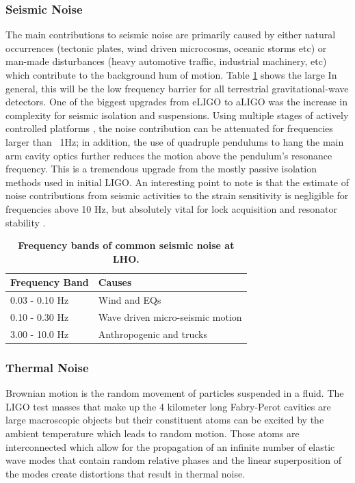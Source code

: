 		\subsubsection{Seismic Noise}
		The main contributions to seismic noise are primarily caused by either natural occurrences (tectonic plates, wind driven microcosms, oceanic storms etc) or man-made disturbances (heavy automotive traffic, industrial machinery, etc) which contribute to the background hum of motion.  Table \ref{tbl:sei_noise} shows the large   In general, this will be the low frequency barrier for all terrestrial gravitational-wave detectors.  One of the biggest upgrades from eLIGO to aLIGO was the increase in complexity for seismic isolation and suspensions.  Using multiple stages of actively controlled platforms \cite{fabrice_sei1} \cite{fabrice_sei2} \cite{fabrice_strat}\cite{sei_isol}, the noise contribution can be attenuated for frequencies larger than ~1Hz;  in addition, the use of quadruple pendulums to hang the main arm cavity optics further reduces the motion above the pendulum's resonance frequency\cite{driggers_global}\cite{BlairBook}. This is a tremendous upgrade from the mostly passive isolation methods used in initial LIGO.  An interesting point to note is that the estimate of noise contributions from seismic activities to the strain sensitivity is negligible for frequencies above 10 Hz, but absolutely vital for lock acquisition and resonator stability \cite{Hang_LF} \cite{Fritschel_alignment}.
		 
		 \begin{table}[h!]
			\centering
			\begin{tabular}{ | l | l |}
				\hline
				\textbf{Frequency Band} & \textbf{Causes}\\ \hline
				0.03 - 0.10 Hz & Wind and EQs\\ \hline
				0.10 - 0.30 Hz & Wave driven micro-seismic motion\\ \hline
				3.00 - 10.0 Hz & Anthropogenic and trucks\\ \hline
			\end{tabular}
			\caption[Frequency bands of common seismic noise at LHO.]
			{\textbf{Frequency bands of common seismic noise at LHO.}
			}
			\label{tbl:sei_noise}
		 \end{table}
		\subsubsection{Thermal Noise}
		Brownian motion \cite{brownian_einstein} is the random movement of particles suspended in a fluid.  The LIGO test masses that make up the 4 kilometer long Fabry-Perot cavities are large macroscopic objects but their constituent atoms can be excited by the ambient temperature which leads to random motion. Those atoms are interconnected which allow for the propagation of an infinite number of elastic wave modes that contain random relative phases and the linear superposition of the modes create distortions that result in thermal noise.	
	
